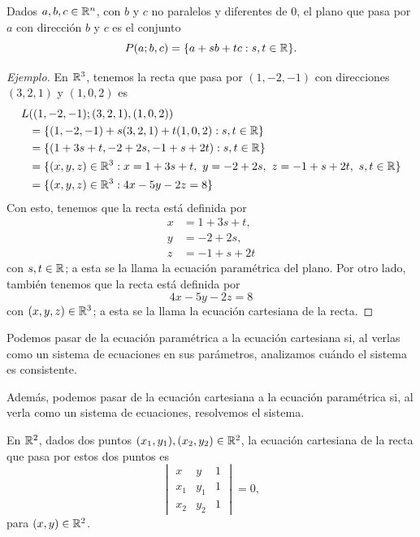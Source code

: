\documentclass[a4,11pt]{aleph-notas}
\begin{document}
\begin{defi}[Plano de $\R^n$]
    Dados $a,b,c\in\mathbb{R}^n$, con $b$ y $c$ no paralelos y diferentes de $0$, el plano que pasa por $a$ con dirección $b$ y $c$ es el conjunto
    \[
        P(a;b,c)=\{a+s  b+t c:s ,t \in\mathbb{R}\}.
    \]
\end{defi}

\begin{proof}[Ejemplo]
    En $\mathbb{R}^3$, tenemos la recta que pasa por $(1,-2,-1)$ con direcciones $(3,2,1)$ y $(1,0,2)$ es
    \begin{align*}
        L&((1,-2,-1);(3,2,1),(1,0,2)) \\
            & = \{(1,-2,-1)+s (3,2,1) + t (1,0,2) :s ,t \in\mathbb{R}\} \\
            & = \{(1+3s +t ,-2+2s ,-1+s +2t ): s ,t \in\mathbb{R}\} \\
            & = \{(x,y,z)\in\mathbb{R}^3: x = 1+3s +t ,\ y=-2+2s ,\ z=-1+s +2t ,\ s ,t \in\mathbb{R}\} \\
            & = \{(x,y,z)\in\mathbb{R}^3: 4x-5y-2z=8\}
    \end{align*}
    Con esto, tenemos que la recta está definida por
    \begin{align*}
        x& = 1+3s +t ,\\
        y& = -2+2s ,\\
        z& = -1+s +2t 
    \end{align*}
    con $s ,t \in \mathbb{R}$; a esta se la llama la ecuación paramétrica del plano. Por otro lado, también tenemos que la recta está definida por 
    \[
        4x-5y-2z=8
    \]
    con $(x,y,z)\in\mathbb{R}^3$; a esta se la llama la ecuación cartesiana de la recta.
\end{proof}

\begin{advertencia}
    Podemos pasar de la ecuación paramétrica a la ecuación cartesiana si, al verlas como un sistema de ecuaciones en sus parámetros, analizamos cuándo el sistema es consistente.
    
    Además, podemos pasar de la ecuación cartesiana a la ecuación paramétrica si, al verla como un sistema de ecuaciones, resolvemos el sistema.
\end{advertencia}

\begin{advertencia}
    En $\mathbb{R}^2$, dados dos puntos $(x_1,y_1),(x_2,y_2)\in\mathbb{R}^2$, la ecuación cartesiana de la recta que pasa por estos dos puntos es
    \[
        \begin{vmatrix}
            x & y & 1\\
            x_1 & y_1 & 1\\
            x_2 & y_2 & 1
        \end{vmatrix}
        = 0,
    \]
    para $(x,y)\in\mathbb{R}^2$.
\end{advertencia}
\end{document}
